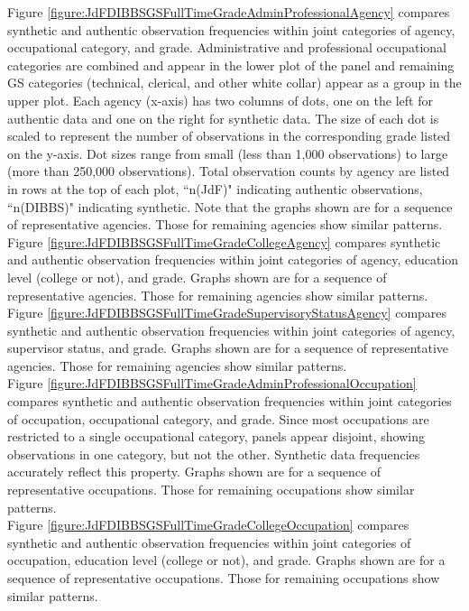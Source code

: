 \documentclass[10pt, letterpaper]{article}
\begin{document}
\begin{spacing}{1.0}
Figure \ref{figure:JdFDIBBSGSFullTimeGradeAdminProfessionalAgency} compares synthetic and authentic observation frequencies within joint categories of agency, occupational category, and grade.  Administrative and professional occupational categories are combined and appear in the lower plot of the panel and remaining GS categories (technical, clerical, and other white collar) appear as a group in the upper plot.  Each agency (x-axis) has two columns of dots, one on the left for authentic data and one on the right for synthetic data.  The size of each dot is scaled to represent the number of observations in the corresponding grade listed on the y-axis.  Dot sizes range from small (less than 1,000 observations) to large (more than 250,000 observations).  Total observation counts by agency are listed in rows at the top of each plot, ``n(JdF)" indicating authentic observations, ``n(DIBBS)" indicating synthetic.  Note that the graphs shown are for a sequence of representative agencies.  Those for remaining agencies show similar patterns.\\

Figure \ref{figure:JdFDIBBSGSFullTimeGradeCollegeAgency} compares synthetic and authentic observation frequencies within joint categories of agency, education level (college or not), and grade.  Graphs shown are for a sequence of representative agencies.  Those for remaining agencies show similar patterns.\\

Figure \ref{figure:JdFDIBBSGSFullTimeGradeSupervisoryStatusAgency} compares synthetic and authentic observation frequencies within joint categories of agency, supervisor status, and grade.  Graphs shown are for a sequence of representative agencies.  Those for remaining agencies show similar patterns.\\

Figure \ref{figure:JdFDIBBSGSFullTimeGradeAdminProfessionalOccupation} compares synthetic and authentic observation frequencies within joint categories of occupation, occupational category, and grade.  Since most occupations are restricted to a single occupational category, panels appear disjoint, showing observations in one category, but not the other.  Synthetic data frequencies accurately reflect this property.  Graphs shown are for a sequence of representative occupations.  Those for remaining occupations show similar patterns.\\

Figure \ref{figure:JdFDIBBSGSFullTimeGradeCollegeOccupation} compares synthetic and authentic observation frequencies within joint categories of occupation, education level (college or not), and grade.  Graphs shown are for a sequence of representative occupations.  Those for remaining occupations show similar patterns.\\


\end{spacing}
\end{document}
